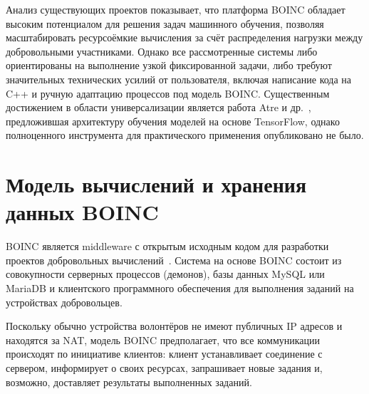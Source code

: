 \documentclass[a4paper,12pt]{extarticle}
\begin{document}
Анализ существующих проектов показывает, что платформа BOINC обладает высоким потенциалом для решения задач машинного обучения, позволяя масштабировать ресурсоёмкие вычисления за счёт распределения нагрузки между добровольными участниками. Однако все рассмотренные системы либо ориентированы на выполнение узкой фиксированной задачи, либо требуют значительных технических усилий от пользователя, включая написание кода на C++ и ручную адаптацию процессов под модель BOINC. Существенным достижением в области универсализации является работа Atre и др.~\cite{atre2021distributed}, предложившая архитектуру обучения моделей на основе TensorFlow, однако полноценного инструмента для практического применения опубликовано не было.

\section{Модель вычислений и хранения данных BOINC}

BOINC является middleware с открытым исходным кодом для разработки проектов добровольных вычислений~\cite{anderson2004boinc,anderson2020boinc}. Система на основе BOINC состоит из совокупности серверных процессов (демонов), базы данных MySQL или MariaDB и клиентского программного обеспечения для выполнения заданий на устройствах добровольцев.

Поскольку обычно устройства волонтёров не имеют публичных IP адресов и находятся за NAT, модель BOINC предполагает, что все коммуникации происходят по инициативе клиентов: клиент устанавливает соединение с сервером, информирует о своих ресурсах, запрашивает новые задания и, возможно, доставляет результаты выполненных заданий.
\end{document}
